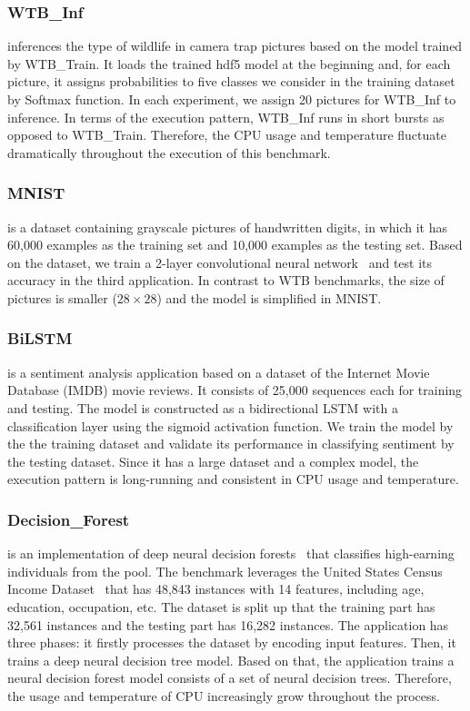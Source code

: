 \subsubsection{WTB\_Inf}

inferences the type of wildlife in camera trap pictures based on the model trained by WTB\_Train. It loads the trained hdf5 model at the beginning and, for each picture, it assigns probabilities to five classes we consider in the training dataset by Softmax function. In each experiment, we assign 20 pictures for WTB\_Inf to inference. In terms of the execution pattern, WTB\_Inf runs in short bursts as opposed to WTB\_Train. Therefore, the CPU usage and temperature fluctuate dramatically throughout the execution of this benchmark.

\subsubsection{MNIST}

 is a dataset containing grayscale pictures of handwritten digits, in which it has 60,000 examples as the training set and 10,000 examples as the testing set. Based on the dataset, we train a 2-layer convolutional neural network~\cite{ref:MNIST} and test its accuracy in the third application. In contrast to WTB benchmarks, the size of pictures is smaller ($28 \times 28$) and the model is simplified in MNIST. 

\subsubsection{BiLSTM} is a sentiment analysis application based on a dataset of the Internet Movie Database (IMDB) movie reviews. It consists of 25,000 sequences each for training and testing. The model is constructed as a bidirectional LSTM with a classification layer using the sigmoid activation function. We train the model by the the training dataset and validate its performance in classifying sentiment by the testing dataset. Since it has a large dataset and a complex model, the execution pattern is long-running and consistent in CPU usage and temperature.


\subsubsection{Decision\_Forest} is an implementation of deep neural decision forests~\cite{ref:decision_forest} that classifies high-earning individuals from the pool. The benchmark leverages the United States Census Income Dataset~\cite{ref:uci} that has 48,843 instances with 14 features, including age, education, occupation, etc. The dataset is split up that the training part has 32,561 instances and the testing part has 16,282 instances. The application has three phases: it firstly processes the dataset by encoding input features. Then, it trains a deep neural decision tree model. Based on that, the application trains a neural decision forest model consists of a set of neural decision trees. Therefore, the usage and temperature of CPU increasingly grow throughout the process.



